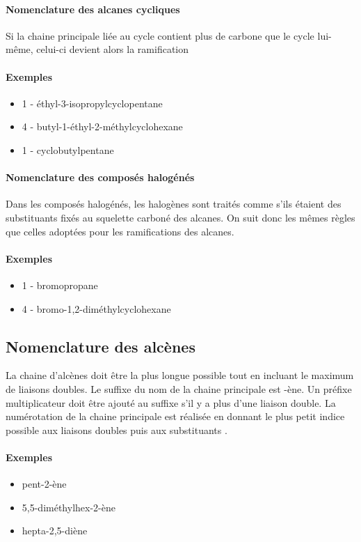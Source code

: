 \paragraph{Nomenclature des alcanes cycliques}
Si la chaine principale liée au cycle contient plus de carbone que le cycle lui-même, celui-ci devient alors la ramification

\paragraph{Exemples}
\begin{itemize}
  \item 1 - éthyl-3-isopropylcyclopentane
  \item 4 - butyl-1-éthyl-2-méthylcyclohexane
  \item 1 - cyclobutylpentane
\end{itemize}

\paragraph{Nomenclature des composés halogénés}
Dans les composés halogénés, les halogènes sont traités comme s'ils étaient des substituants fixés au squelette carboné des alcanes.
On suit donc les mêmes règles que celles adoptées pour les ramifications des alcanes.

\paragraph{Exemples }
\begin{itemize}
  \item 1 - bromopropane
  \item 4 - bromo-1,2-diméthylcyclohexane
\end{itemize}

\subsection{Nomenclature des alcènes}
La chaine d'alcènes doit être la plus longue possible tout en incluant le maximum de liaisons doubles.
Le suffixe du nom de la chaine principale est -ène.
Un préfixe multiplicateur doit être ajouté au suffixe s'il y a plus d'une liaison double.
La numérotation de la chaine principale est réalisée en donnant le plus petit indice possible aux liaisons doubles puis aux substituants .

\paragraph{Exemples}
\begin{itemize}
  \item pent-2-ène
  \item 5,5-diméthylhex-2-ène
  \item hepta-2,5-diène
\end{itemize}

